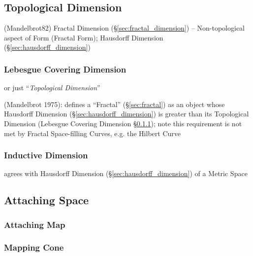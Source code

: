 \subsection{Topological Dimension}\label{sec:topological_dimension}

(Mandelbrot82) \fist Fractal Dimension (\S\ref{sec:fractal_dimension}) --
Non-topological aspect of Form (Fractal Form); Hausdorff Dimension
(\S\ref{sec:hausdorff_dimension})




\subsubsection{Lebesgue Covering Dimension}\label{sec:lebesgue_dimension}

or just ``\emph{Topological Dimension}''

(Mandelbrot 1975): defines a ``Fractal'' (\S\ref{sec:fractal}) as an object
whose Hausdorff Dimension (\S\ref{sec:hausdorff_dimension}) is greater than its
Topological Dimension (Lebesgue Covering Dimension
\S\ref{sec:lebesgue_dimension}); note this requirement is not met by Fractal
Space-filling Curves, e.g. the Hilbert Curve



\subsubsection{Inductive Dimension}\label{sec:inductive_dimension}

agrees with Hausdorff Dimension (\S\ref{sec:hausdorff_dimension}) of a Metric
Space



\subsection{Attaching Space}\label{sec:attaching_space}

\subsubsection{Attaching Map}\label{sec:attaching_map}

\subsubsection{Mapping Cone}\label{sec:mapping_cone}



